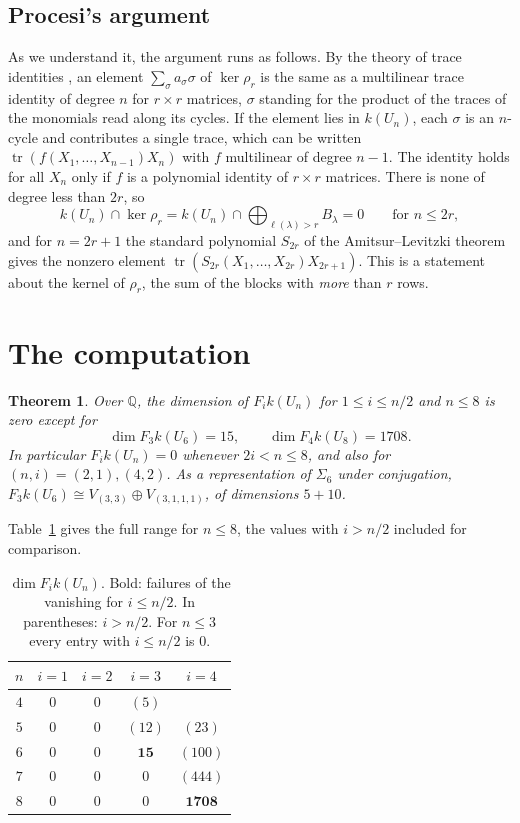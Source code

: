 \documentclass[11pt,a4paper]{amsart}
\newtheorem{theorem}{Theorem}[section]
\theoremstyle{definition}
\theoremstyle{remark}
\newcommand{\Q}{\mathbb Q}
\begin{document}
\subsection*{Procesi's argument}
As we understand it, the argument runs as follows. By the theory of trace identities \cite{procesi}, an element $\sum_\sigma a_\sigma \sigma$ of $\ker \rho_r$ is the same as a multilinear trace identity of degree $n$ for $r \times r$ matrices, $\sigma$ standing for the product of the traces of the monomials read along its cycles. If the element lies in $k(U_n)$, each $\sigma$ is an $n$-cycle and contributes a single trace, which can be written $\operatorname{tr}(f(X_1, \dots, X_{n-1})X_n)$ with $f$ multilinear of degree $n-1$. The identity holds for all $X_n$ only if $f$ is a polynomial identity of $r \times r$ matrices. There is none of degree less than $2r$, so
\[
k(U_n) \cap \ker \rho_r = k(U_n) \cap \bigoplus_{\ell(\lambda) > r} B_\lambda = 0 \qquad \text{for } n \le 2r,
\]
and for $n = 2r + 1$ the standard polynomial $S_{2r}$ of the Amitsur--Levitzki theorem gives the nonzero element $\operatorname{tr}(S_{2r}(X_1, \dots, X_{2r})X_{2r+1})$. This is a statement about the kernel of $\rho_r$, the sum of the blocks with \emph{more} than $r$ rows.

\section{The computation}\label{sec:result}

\begin{theorem}\label{thm:main}
Over $\Q$, the dimension of $F_i k(U_n)$ for $1 \le i \le n/2$ and $n \le 8$ is zero except for
\[
\dim F_3 k(U_6) = 15, \qquad \dim F_4 k(U_8) = 1708 .
\]
In particular $F_i k(U_n) = 0$ whenever $2i < n \le 8$, and also for $(n, i) = (2, 1), (4, 2)$. As a representation of $\Sigma_6$ under conjugation, $F_3 k(U_6) \cong V_{(3,3)} \oplus V_{(3,1,1,1)}$, of dimensions $5 + 10$.
\end{theorem}

Table~\ref{tab:dims} gives the full range for $n \le 8$, the values with $i > n/2$ included for comparison.

\begin{table}[h]
\centering
\begin{tabular}{c|cccc}
\toprule
$n$ & $i=1$ & $i=2$ & $i=3$ & $i=4$ \\
\midrule
$4$ & $0$ & $0$ & $(5)$ & \\
$5$ & $0$ & $0$ & $(12)$ & $(23)$ \\
$6$ & $0$ & $0$ & $\mathbf{15}$ & $(100)$ \\
$7$ & $0$ & $0$ & $0$ & $(444)$ \\
$8$ & $0$ & $0$ & $0$ & $\mathbf{1708}$ \\
\bottomrule
\end{tabular}
\medskip
\caption{$\dim F_i k(U_n)$. Bold: failures of the vanishing for $i \le n/2$. In parentheses: $i > n/2$. For $n \le 3$ every entry with $i \le n/2$ is $0$.}\label{tab:dims}
\end{table}
\end{document}
